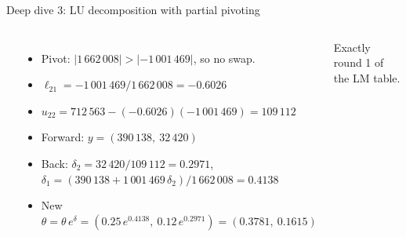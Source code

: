 \documentclass[aspectratio=169,11pt]{beamer}
\begin{document}
\begin{frame}[shrink=5]{Deep dive 3: LU decomposition with partial pivoting}
\begin{columns}[T]
\[    \]
    \begin{itemize}\scriptsize
      \item Pivot: $|1\,662\,008| > |{-1\,001\,469}|$, so no swap.
      \item $\ell_{21} = -1\,001\,469 / 1\,662\,008 = -0.6026$
      \item $u_{22} = 712\,563 - (-0.6026)(-1\,001\,469) = 109\,112$
      \item Forward: $y = (390\,138,\ 32\,420)$
      \item Back: $\delta_2 = 32\,420/109\,112 = 0.2971$,\\
            $\delta_1 = (390\,138 + 1\,001\,469\,\delta_2)/1\,662\,008 = 0.4138$
      \item New $\theta = \theta\,e^{\delta} = (0.25\,e^{0.4138},\ 0.12\,e^{0.2971}) = \mathbf{(0.3781,\ 0.1615)}$
    \end{itemize}
    {\color{muted} Exactly round 1 of the LM table.}
  \end{columns}
\end{frame}
\end{document}
